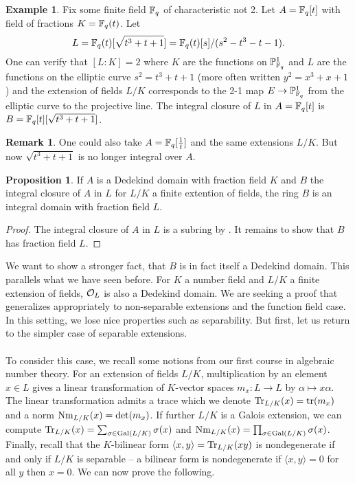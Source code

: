\documentclass{amsart}
\theoremstyle{definition}
\newtheorem{example}[theorem]{Example}
\newtheorem{proposition}[theorem]{Proposition}
\newtheorem*{remark}{Remark}
\numberwithin{equation}{section}
\begin{document}
\begin{example}
  Fix some finite field $\mathbb{F}_{q}$ of characteristic not 2. Let $A=\mathbb{F}_{q}[t]$ with field of fractions $K=\mathbb{F}_{q}(t)$. Let 
  $$L=\mathbb{F}_{q}(t)[\sqrt{t^{3}+t+1}]=\mathbb{F}_{q}(t)[s]/(s^{2}-t^{3}-t-1).$$
  One can verify that $[L:K]=2$ where $K$ are the functions on $\mathbb{P}^{1}_{\mathbb{F}_{q}}$ and $L$ are the functions on the elliptic curve $s^{2}=t^{3}+t+1$ (more often written $y^{2}=x^{3}+x+1$) and the extension of fields $L/K$ corresponds to the 2-1 map $E\to\mathbb{P}^{1}_{\mathbb{F}_{q}}$ from the elliptic curve to the projective line. The integral closure of $L$ in $A=\mathbb{F}_{q}[t]$ is $B=\mathbb{F}_{q}[t][\sqrt{t^{3}+t+1}]$. 
\end{example}
\begin{remark}
  One could also take $A=\mathbb{F}_{q}[\frac{1}{t}]$ and the same extensions $L/K$. But now $\sqrt{t^{3}+t+1}$ is no longer integral over $A$. 
\end{remark}
\begin{proposition}
  If $A$ is a Dedekind domain with fraction field $K$ and $B$ the integral closure of $A$ in $L$ for $L/K$ a finite extention of fields, the ring $B$ is an integral domain with fraction field $L$. 
\end{proposition}
\begin{proof}
  The integral closure of $A$ in $L$ is a subring by . It remains to show that $B$ has fraction field $L$. 
\end{proof}
We want to show a stronger fact, that $B$ is in fact itself a Dedekind domain. This parallels what we have seen before. For $K$ a number field and $L/K$ a finite extension of fields, $\mathcal{O}_{L}$ is also a Dedekind domain. We are seeking a proof that generalizes appropriately to non-separable extensions and the function field case. In this setting, we lose nice properties such as separability. But first, let us return to the simpler case of separable extensions. 
\\\\
To consider this case, we recall some notions from our first course in algebraic number theory. For an extension of fields $L/K$, multiplication by an element $x\in L$ gives a linear transformation of $K$-vector spaces $m_{x}:L\to L$ by $\alpha\mapsto x\alpha$. The linear transformation admits a trace which we denote $\mathrm{Tr}_{L/K}(x)=\mathrm{tr}(m_{x})$ and a norm $\mathrm{Nm}_{L/K}(x)=\det(m_{x})$. If further $L/K$ is a Galois extension, we can compute $\mathrm{Tr}_{L/K}(x)=\sum_{\sigma\in\mathrm{Gal}(L/K)}\sigma(x)$ and $\mathrm{Nm}_{L/K}(x)=\prod_{\sigma\in\mathrm{Gal}(L/K)}\sigma(x)$. Finally, recall that the $K$-bilinear form $\langle x,y\rangle=\mathrm{Tr}_{L/K}(xy)$ is nondegenerate if and only if $L/K$ is separable -- a bilinear form is nondegenerate if $\langle x,y\rangle=0$ for all $y$ then $x=0$. We can now prove the following. 
\end{document}
